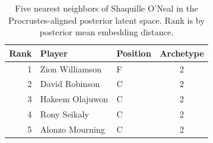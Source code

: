 \begin{table}[htbp]
  \centering\small
  \begin{tabular}{rllc}
    \toprule
    Rank & Player & Position & Archetype \\
    \midrule
    1 & Zion Williamson & F & 2 \\
    2 & David Robinson & C & 2 \\
    3 & Hakeem Olajuwon & C & 2 \\
    4 & Rony Seikaly & C & 2 \\
    5 & Alonzo Mourning & C & 2 \\
    \bottomrule
  \end{tabular}
  \caption{Five nearest neighbors of Shaquille O'Neal in the Procrustes-aligned posterior latent space. Rank is by posterior mean embedding distance.}
  \label{tab:Shaquille_O_Neal_neighbors}
\end{table}

